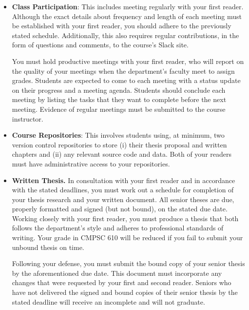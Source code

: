 \vspace*{-.05in}

\begin{itemize}
  \itemsep -.25em

  \item {\bf Class Participation}: This includes meeting regularly with your first reader. Although the exact details
    about frequency and length of each meeting must be established with your first reader, you should adhere to the
    previously stated schedule. Additionally, this also requires regular contributions, in the form of questions and
    comments, to the course's Slack site.

  You must hold productive meetings with your first reader, who will report on the quality of your meetings when the
  department's faculty meet to assign grades.  Students are expected to come to each meeting with a status update on
  their progress and a meeting agenda.  Students should conclude each meeting by listing the tasks that they want to
  complete before the next meeting. Evidence of regular meetings must be submitted to the course instructor.

  \item {\bf Course Repositories}: This involves students using, at minimum, two version control repositories to
    store (i) their thesis proposal and written chapters and (ii) any relevant source code and data.  Both of your
    readers must have administrative access to your repositories.


  \item {\bf Written Thesis.} In consultation with your first reader and in accordance with the stated deadlines, you
    must work out a schedule for completion of your thesis research and your written document. All senior theses are
    due, properly formatted and signed (but not bound), on the stated due date.  Working closely with your first reader,
    you must produce a thesis that both follows the department's style and adheres to professional standards of writing.
    Your grade in CMPSC 610 will be reduced if you fail to submit your unbound thesis on time.

    Following your defense, you must submit the bound copy of your senior thesis by the aforementioned due date.  This
    document must incorporate any changes that were requested by your first and second reader. Seniors who have not
    delivered the signed and bound copies of their senior thesis by the stated deadline will receive an
    incomplete and will not graduate.


\end{itemize}

